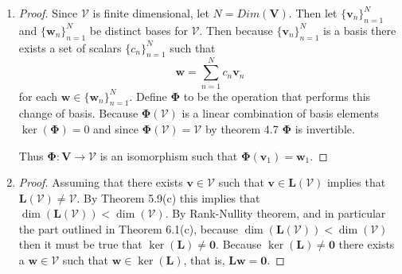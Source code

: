\documentclass[12pt]{amsart}
\begin{document}
\begin{enumerate}[label=\arabic*.]
\vspace{2.5em}

	\item
\begin{proof}
	Since $\mathcal{V}$ is finite dimensional, let \(N=Dim(\mathbf{V})\).
	Then let \(\{\mathbf{v}_n\}_{n=1}^N\) and \(\{\mathbf{w}_n\}_{n=1}^N\) be distinct bases for $\mathcal{V}$. 
	Then because \(\{\mathbf{v}_n\}_{n=1}^N\) is a basis there exists a
	set of scalars \(\{c_n\}_{n=1}^N\) such that
	\[		\mathbf{w} = \sum_{n=1}^{N}c_n\mathbf{v}_n	\]
	for each $\mathbf{w}\in\{\mathbf{w}_n\}_{n=1}^N$.
	Define \(\boldsymbol{\Phi}\) to be the operation that performs this change of basis.
	Because \(\boldsymbol{\Phi}(\mathcal{V})\) is a linear combination of basis elements \(\operatorname{ker}(\boldsymbol{\Phi})=0\) and since \(\boldsymbol{\Phi}(\mathcal{V})=\mathcal{V}\) by theorem 4.7 \(\boldsymbol{\Phi}\) is invertible.
	
	Thus \(\boldsymbol{\Phi}:\mathbf{V}\rightarrow\mathcal{V}\) is an isomorphism such that \(\boldsymbol{\Phi}(\mathbf{v}_1)=\mathbf{w}_1\).
\end{proof}
\begin{comment}
	A vector space mapped to itself is implicitely isomorphic.
	Therefore there exists an isomorphism, which is by definition bijective.
	
\end{comment}

\vspace{2.5em}

	\item 
\begin{proof}
	Assuming that there exists \(\mathbf{v}\in\mathcal{V}\)
	such that \(\mathbf{v}\in\mathbf{L}(\mathcal{V})\)
	implies that \(\mathbf{L}(\mathcal{V}) \neq \mathcal{V}\).
	By Theorem 5.9(c) this implies that \(\dim(\mathbf{L}(\mathcal{V})) < \dim(\mathcal{V})\).
	By Rank-Nullity theorem, and in particular the part outlined in Theorem 6.1(c),
	because \(\dim(\mathbf{L}(\mathcal{V})) < \dim(\mathcal{V})\)
	then it must be true that \(\ker(\mathbf{L}) \neq {\mathbf{0}}\).
	Because \(\ker(\mathbf{L}) \neq {\mathbf{0}}\)
	there exists a \(\mathbf{w}\in\mathcal{V}\)
	such that \(\mathbf{w}\in\ker(\mathbf{L})\),
	that is, \(\mathbf{L}\mathbf{w}=\mathbf{0}\).
\end{proof}


\end{enumerate}
\end{document}
